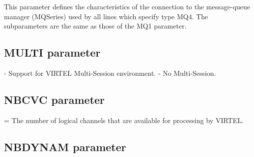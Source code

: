 \documentclass[letterpaper,10pt,english]{sphinxmanual}
\begin{document}
This parameter defines the characteristics of the connection to the message-queue manager (MQSeries) used by all lines which specify type MQ4. The subparameters are the same as those of the MQ1 parameter.

\ignorespaces 

\subsection{MULTI parameter}
\label{\detokenize{Installation_Guide:multi-parameter}}\label{\detokenize{Installation_Guide:index-92}}
\begin{sphinxVerbatim}[commandchars=\\\{\}]
 
\end{sphinxVerbatim}

 - Support for VIRTEL Multi-Session environment.
 - No Multi-Session.

\ignorespaces 

\subsection{NBCVC parameter}
\label{\detokenize{Installation_Guide:nbcvc-parameter}}\label{\detokenize{Installation_Guide:index-93}}
\begin{sphinxVerbatim}[commandchars=\\\{\}]
 
\end{sphinxVerbatim}

 = The number of logical channels that are available for processing by VIRTEL.

\ignorespaces 

\subsection{NBDYNAM parameter}
\label{\detokenize{Installation_Guide:nbdynam-parameter}}\label{\detokenize{Installation_Guide:index-94}}
\begin{sphinxVerbatim}[commandchars=\\\{\}]
 
\end{sphinxVerbatim}
\end{document}
